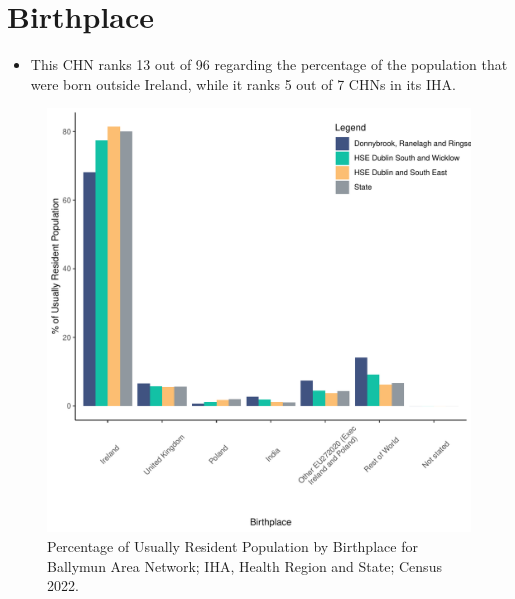 \documentclass{article}
\begin{document}
\section{Birthplace}\label{sect:Birth}
\begin{itemize}
\item This CHN ranks  13 out of 96 regarding the percentage of the population that were born outside Ireland, while it ranks  5 out of 7 CHNs in its IHA.
\end{itemize}
\begin{figure}[H]
	\centering
	\includegraphics[width = 130mm]{../figures/BirthED.pdf}
	\caption{Percentage of Usually Resident Population by Birthplace for Ballymun Area Network; IHA, Health Region and State; Census 2022.}
	\label{fig:vbnv}
	\end{figure}
	
\end{document}

